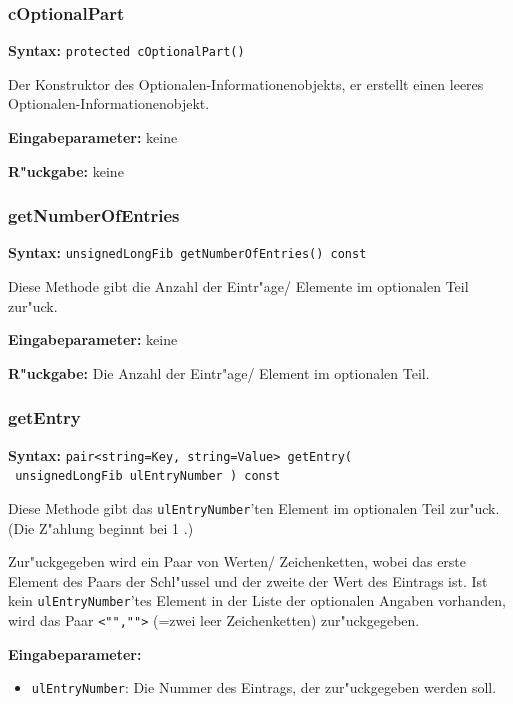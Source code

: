 \subsubsection{cOptionalPart}

\textbf{Syntax:} \verb|protected cOptionalPart()|

\bigskip\noindent
Der Konstruktor des Optionalen-Informationenobjekts, er erstellt einen leeres Op\-tio\-na\-len-Informationenobjekt.

\bigskip\noindent
\textbf{Eingabeparameter:} keine

\bigskip\noindent
\textbf{R"uckgabe:} keine


\subsubsection{getNumberOfEntries}

\textbf{Syntax:} \verb|unsignedLongFib getNumberOfEntries() const|

\bigskip\noindent
Diese Methode gibt die Anzahl der Eintr"age/ Elemente im optionalen Teil zur"uck.

\bigskip\noindent
\textbf{Eingabeparameter:} keine

\bigskip\noindent
\textbf{R"uckgabe:} Die Anzahl der Eintr"age/ Element im optionalen Teil.


\subsubsection{getEntry}

\textbf{Syntax:} \verb|pair<string=Key, string=Value> getEntry(| \\\verb| unsignedLongFib ulEntryNumber ) const|

\bigskip\noindent
Diese Methode gibt das \verb|ulEntryNumber|'ten Element im optionalen Teil zur"uck. (Die Z"ahlung beginnt bei 1 .)

Zur"uckgegeben wird ein Paar von Werten/ Zeichenketten, wobei das erste Element des Paars der Schl"ussel und der zweite der Wert des Eintrags ist. Ist kein \verb|ulEntryNumber|'tes Element in der Liste der optionalen Angaben vorhanden, wird das Paar \verb|<"","">| (=zwei leer Zeichenketten) zur"uckgegeben.

\bigskip\noindent
\textbf{Eingabeparameter:}
\begin{itemize}
 \item \verb|ulEntryNumber|: Die Nummer des Eintrags, der zur"uckgegeben werden soll.
\end{itemize}

